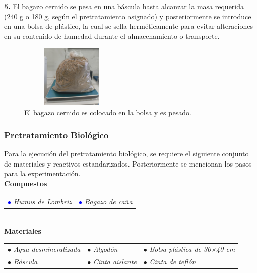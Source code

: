 \documentclass[12pt]{article}
\begin{document}
	
			\textbf{5.} El bagazo cernido se pesa en una báscula hasta alcanzar la masa requerida (240 g o 180 g, según el pretratamiento asignado) y posteriormente se introduce en una bolsa de plástico, la cual se sella herméticamente para evitar alteraciones en su contenido de humedad durante el almacenamiento o transporte.
			
			
			\begin{figure} [H]
				\centering
				\includegraphics[width=5cm, height=3cm]{imagenes/cernir_bagazo_pesado}
				\caption{El bagazo cernido es colocado en la bolsa y es pesado.}
				\label{cernir_bagazo_pesado}
			\end{figure}
			
			
			
			
			\subsubsection{Pretratamiento Biológico}
	
			
		Para la ejecución del pretratamiento biológico, se requiere el siguiente conjunto de materiales y reactivos estandarizados. Posteriormente se mencionan los pasos para la experimentación.\\
			
			\textbf{Compuestos} \\[0.5em]
			

				\begin{tabular}{p{0.3\textwidth}p{}}
				\textcolor{blue}{$\bullet$} \textit{Humus de Lombriz}  &	\textcolor{blue}{$\bullet$} \textit{Bagazo de caña}
			\end{tabular} \\[0.5em]
			
			\textbf{Materiales} \\[0.5em] 
	
			\begin{tabular}{p{}p{}p{}}
				$\bullet$ \textit{Agua desmineralizada } & $\bullet$ \textit{Algodón} & $\bullet$ \textit{Bolsa plástica de 30×40 cm }\\
				$\bullet$ \textit{Báscula} & $\bullet$ \textit{Cinta aislante} & $\bullet$ \textit{Cinta de teflón}
			\end{tabular}
			\\[1em]
			
\end{document}
